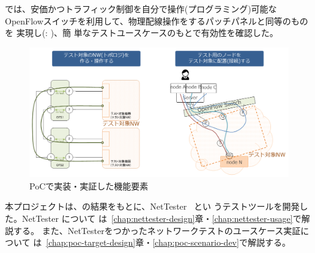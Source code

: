 \lopj では、安価かつトラフィック制御を自分で操作(プログラミング)可能な
OpenFlowスイッチを利用して、物理配線操作をするパッチパネルと同等のものを
実現し(: )、簡
単なテストユースケースのもとで有効性を確認した。

\begin{figure}[h]
 \centering
 \includegraphics[scale=0.5]{img/poc-l1patchpj.png}
 \caption{\lopj PoCで実装・実証した機能要素}
 \label{fig:poc-l1patchpj}
\end{figure}



 本プロジェクトは、\lopj の結果をもとに、NetTester~\cite{nettester} とい
 うテストツールを開発した。NetTester について
 は~\ref{chap:nettester-design}章・\ref{chap:nettester-usage}で解説する。
 また、NetTesterをつかったネットワークテストのユースケース実証について
 は~\ref{chap:poc-target-design}章・\ref{chap:poc-scenario-dev}で解説する。


